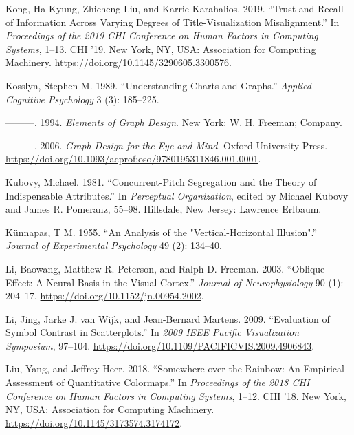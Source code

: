\documentclass[
  letterpaper,
  DIV=11,
  numbers=noendperiod]{scrreprt}
\newlength{\cslhangindent}
\newenvironment{CSLReferences}[2] %
 {\begin{list}{}{%
  \setlength{\itemindent}{0pt}
  \setlength{\leftmargin}{0pt}
  \setlength{\parsep}{0pt}
  \ifodd #1
   \setlength{\leftmargin}{\cslhangindent}
   \setlength{\itemindent}{-1\cslhangindent}
  \fi
  \setlength{\itemsep}{#2\baselineskip}}}
 {\end{list}}
\begin{document}
\begin{CSLReferences}{1}{0}
Kong, Ha-Kyung, Zhicheng Liu, and Karrie Karahalios. 2019. {``Trust and
Recall of Information Across Varying Degrees of Title-Visualization
Misalignment.''} In \emph{Proceedings of the 2019 CHI Conference on
Human Factors in Computing Systems}, 1--13. CHI '19. New York, NY, USA:
Association for Computing Machinery.
\url{https://doi.org/10.1145/3290605.3300576}.

Kosslyn, Stephen M. 1989. {``Understanding Charts and Graphs.''}
\emph{Applied Cognitive Psychology} 3 (3): 185--225.

---------. 1994. \emph{Elements of Graph Design}. New York: W. H.
Freeman; Company.

---------. 2006. \emph{Graph Design for the Eye and Mind}. Oxford
University Press.
\url{https://doi.org/10.1093/acprof:oso/9780195311846.001.0001}.

Kubovy, Michael. 1981. {``Concurrent-Pitch Segregation and the Theory of
Indispensable Attributes.''} In \emph{Perceptual Organization}, edited
by Michael Kubovy and James R. Pomeranz, 55--98. Hillsdale, New Jersey:
Lawrence Erlbaum.

Künnapas, T M. 1955. {``An Analysis of the "Vertical-Horizontal
Illusion".''} \emph{Journal of Experimental Psychology} 49 (2): 134--40.

Li, Baowang, Matthew R. Peterson, and Ralph D. Freeman. 2003. {``Oblique
Effect: A Neural Basis in the Visual Cortex.''} \emph{Journal of
Neurophysiology} 90 (1): 204--17.
\url{https://doi.org/10.1152/jn.00954.2002}.

Li, Jing, Jarke J. van Wijk, and Jean-Bernard Martens. 2009.
{``Evaluation of Symbol Contrast in Scatterplots.''} In \emph{2009 IEEE
Pacific Visualization Symposium}, 97--104.
\url{https://doi.org/10.1109/PACIFICVIS.2009.4906843}.

Liu, Yang, and Jeffrey Heer. 2018. {``Somewhere over the Rainbow: An
Empirical Assessment of Quantitative Colormaps.''} In \emph{Proceedings
of the 2018 CHI Conference on Human Factors in Computing Systems},
1--12. CHI '18. New York, NY, USA: Association for Computing Machinery.
\url{https://doi.org/10.1145/3173574.3174172}.


\end{CSLReferences}
\end{document}
